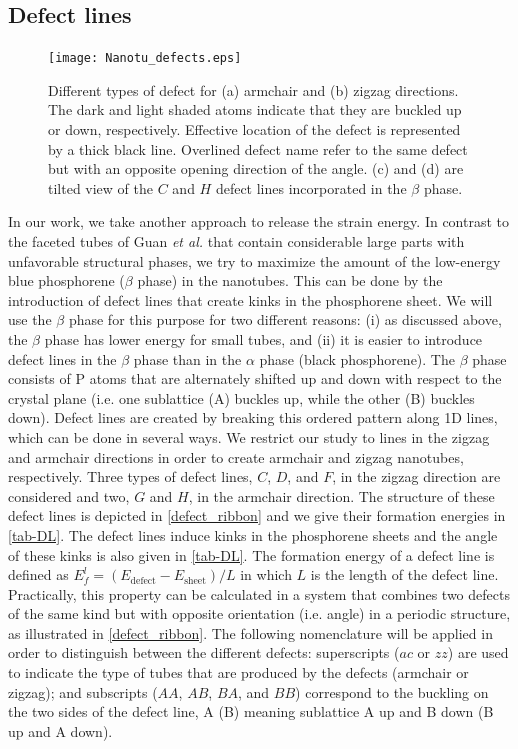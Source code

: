 \subsection{Defect lines} \label{natu_DL}

\begin{figure}[htb]
\centering
\texttt{[image: Nanotu\_defects.eps]}%
\caption{Different types of defect for (a) armchair and (b) zigzag directions. The dark and light shaded atoms indicate that they are buckled up or down, respectively. Effective location of the defect is represented by a thick black line. Overlined defect name refer to the same defect but with an opposite opening direction of the angle. (c) and (d) are tilted view of the $C$ and $H$ defect lines incorporated in the $\beta$ phase.\label{defect_ribbon}}
\end{figure}

In our work, we take another approach to release the strain energy. In contrast to the faceted tubes of Guan \textit{et al.}\cite{Guan2014a} that contain considerable large parts with unfavorable structural phases, we try to maximize the amount of the low-energy blue phosphorene ($\beta$ phase) in the nanotubes. This can be done by the introduction of defect lines that create kinks in the phosphorene sheet. We will use the $\beta$ phase for this purpose for two different reasons: (i) as discussed above, the $\beta$ phase has lower energy for small tubes, and (ii) it is easier to introduce defect lines in the $\beta$ phase than in the $\alpha$ phase (black phosphorene). The $\beta$ phase consists of P atoms that are alternately shifted up and down with respect to the crystal plane (i.e. one sublattice (A) buckles up, while the other (B) buckles down). Defect lines are created by breaking this ordered pattern along 1D lines, which can be done in several ways. We restrict our study to lines in the zigzag and armchair directions in order to create armchair and zigzag nanotubes, respectively. Three types of defect lines, $C$, $D$, and $F$, in the zigzag direction are considered and two, $G$ and $H$, in the armchair direction. The structure of these defect lines is depicted in \autoref{defect_ribbon} and we give their formation energies in  \autoref{tab-DL}. The defect lines induce kinks in the phosphorene sheets and the angle of these kinks is also given in \autoref{tab-DL}. The formation energy of a defect line is defined as  $E_f^l=(E_{\text{defect}}-E_{\text{sheet}})/L$ in which $L$ is the length of the defect line. Practically, this property can be calculated in a system that combines two defects of the same kind but with opposite orientation (i.e. angle) in a periodic structure, as illustrated in \autoref{defect_ribbon}. The following nomenclature will be applied in order to distinguish between the different defects: superscripts ($ac$ or $zz$) are used to indicate the type of tubes that are produced by the defects (armchair or zigzag); and  subscripts ($AA$, $AB$, $BA$, and $BB$) correspond to the buckling on the two sides of the defect line, A (B) meaning sublattice A up and B down (B up and A down). 

